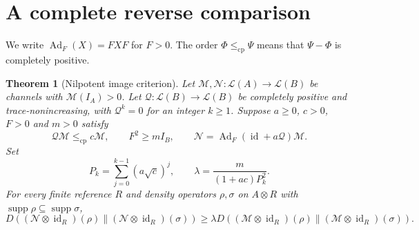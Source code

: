 \documentclass[11pt,a4paper]{article}
\newtheorem{theorem}{Theorem}
\theoremstyle{remark}\newtheorem{remark}[theorem]{Remark}
\newcommand{\id}{\operatorname{id}}
\newcommand{\Ad}{\operatorname{Ad}}
\newcommand{\supp}{\operatorname{supp}}
\newcommand{\cQ}{\mathcal Q}
\newcommand{\cM}{\mathcal M}
\newcommand{\cN}{\mathcal N}
\newcommand{\cp}{\mathrm{cp}}
\newcommand{\D}{D}
\begin{document}
\section{A complete reverse comparison}
We write $\Ad_F(X)=FXF$ for $F>0$.
The order $\Phi\leq_{\cp}\Psi$ means that $\Psi-\Phi$ is completely positive.

\begin{theorem}[Nilpotent image criterion]\label{thm:main}
Let $\cM,\cN:\mathcal L(A)\to\mathcal L(B)$ be channels with $\cM(I_A)>0$.
Let $\cQ:\mathcal L(B)\to\mathcal L(B)$ be completely positive and
trace-nonincreasing, with $\cQ^k=0$ for an integer $k\geq1$.
Suppose $a\geq0$, $c>0$, $F>0$ and $m>0$ satisfy
\begin{equation}
 \cQ\cM\leq_{\cp}c\cM,\qquad
 F^2\geq mI_B,\qquad
 \cN=\Ad_F(\id+a\cQ)\cM.
 \label{eq:hyp}
\end{equation}
Set
\begin{equation}
 P_k=\sum_{j=0}^{k-1}(a\sqrt c)^j,\qquad
 \lambda=\frac{m}{(1+ac)P_k^2}.
 \label{eq:lambda}
\end{equation}
For every finite reference $R$ and density operators $\rho,\sigma$ on
$A\otimes R$ with $\supp\rho\subseteq\supp\sigma$,
\begin{equation}
 \D((\cN\otimes\id_R)(\rho)\|(\cN\otimes\id_R)(\sigma))
 \geq\lambda
 \D((\cM\otimes\id_R)(\rho)\|(\cM\otimes\id_R)(\sigma)).
 \label{eq:main}
\end{equation}
\end{theorem}
\end{document}
